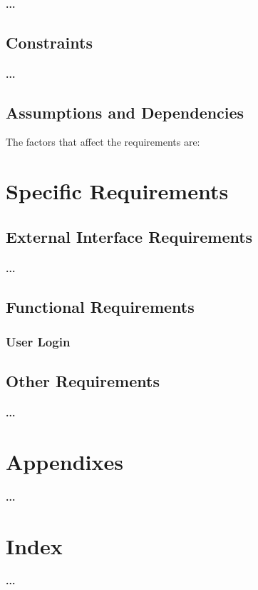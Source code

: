 \documentclass[runningheads,a4paper]{article}
\begin{document}
\paragraph{...}
\subsection{Constraints}
\paragraph{...}

\subsection{Assumptions and Dependencies}
The factors that affect the requirements are:



\section{Specific Requirements}

\subsection{External Interface Requirements}
\paragraph{...}
\subsection{Functional Requirements}

\subsubsection{User Login}
\subsection{Other Requirements}
\paragraph{...}

\section{Appendixes}
\paragraph{...}

\section{Index}
\paragraph{...}
\end{document}

